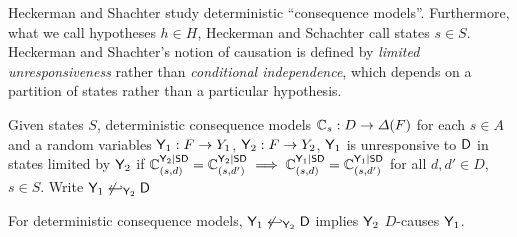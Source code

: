 Heckerman and Shachter study deterministic ``consequence models''. Furthermore, what we call hypotheses $h\in H$, Heckerman and Schachter call states $s\in S$. Heckerman and Shachter's notion of causation is defined by \emph{limited unresponsiveness} rather than \emph{conditional independence}, which depends on a partition of states rather than a particular hypothesis.

\begin{definition}
    Given states $S$, deterministic consequence models $\mathbb{C}_s:D\to \Delta(F)$ for each $s\in A$ and a random variables $\mathsf{Y}_1:F\to Y_1$, $\mathsf{Y}_2:F\to Y_2$, $\mathsf{Y}_1$ is unresponsive to $\mathsf{D}$ in states limited by $\mathsf{Y}_2$ if $\mathbb{C}_{(s,d)}^{\mathsf{Y}_2|\mathsf{S}\mathsf{D}}=\mathbb{C}_{(s,d')}^{\mathsf{Y}_2|\mathsf{S}\mathsf{D}}\implies \mathbb{C}_{(s,d)}^{\mathsf{Y}_1|\mathsf{S}\mathsf{D}}=\mathbb{C}_{(s,d')}^{\mathsf{Y}_1|\mathsf{S}\mathsf{D}}$ for all $d,d'\in D$, $s\in S$. Write $\mathsf{Y}_1\not\hookleftarrow_{\mathsf{Y}_2} \mathsf{D}$
\end{definition}

\begin{lemma}
For deterministic consequence models, $\mathsf{Y}_1\not\hookleftarrow_{\mathsf{Y}_2} \mathsf{D} $ implies $\mathsf{Y}_2$ $D$-causes $\mathsf{Y}_1$.
\end{lemma}

